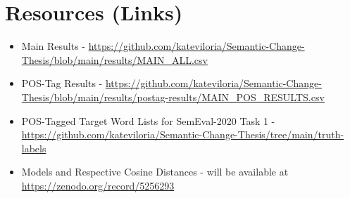 \section{Resources (Links)}
\label{app-resources}


\begin{itemize}

  \item Main Results - \href{https://github.com/kateviloria/Semantic-Change-Thesis/blob/main/results/MAIN_ALL.csv}{https://github.com/kateviloria/Semantic-Change-Thesis/blob/main/results/MAIN\_ALL.csv}
    
  \item POS-Tag Results - \href{https://github.com/kateviloria/Semantic-Change-Thesis/blob/main/results/postag-results/MAIN_POS_RESULTS.csv}{https://github.com/kateviloria/Semantic-Change-Thesis/blob/main/results/postag-results/MAIN\_POS\_RESULTS.csv}
  
  \item POS-Tagged Target Word Lists for SemEval-2020 Task 1 - \href{https://github.com/kateviloria/Semantic-Change-Thesis/tree/main/truth-labels}{https://github.com/kateviloria/Semantic-Change-Thesis/tree/main/truth-labels}
  
  \item Models and Respective Cosine Distances - will be available at \href{https://zenodo.org/record/5256293}{https://zenodo.org/record/5256293}
  
\end{itemize}